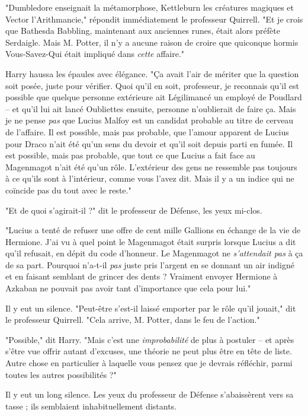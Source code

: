 "Dumbledore enseignait la métamorphose, Kettleburn les créatures magiques et Vector l'Arithmancie," répondit immédiatement le professeur Quirrell. "Et je crois que Bathesda Babbling, maintenant aux anciennes runes, était alors préfète Serdaigle. Mais M. Potter, il n'y a aucune raison de croire que quiconque hormis Vous-Savez-Qui était impliqué dans \emph{cette}  affaire."

Harry haussa les épaules avec élégance. "Ça avait l'air de mériter que la question soit posée, juste pour vérifier. Quoi qu'il en soit, professeur, je reconnais qu'il est possible que quelque personne extérieure ait Légilimancé un employé de Poudlard – et qu'il lui ait lancé Oubliettes ensuite, personne n'oublierait de faire ça. Mais je ne pense \emph{pas}  que Lucius Malfoy est un candidat probable au titre de cerveau de l'affaire. Il est possible, mais pas probable, que l'amour apparent de Lucius pour Draco n'ait été qu'un sens du devoir et qu'il soit depuis parti en fumée. Il est possible, mais pas probable, que tout ce que Lucius a fait face au Magenmagot n'ait été qu'un rôle. L'extérieur des gens ne ressemble pas toujours à ce qu'ils sont à l'intérieur, comme vous l'avez dit. Mais il y a un indice qui ne coïncide pas du tout avec le reste."

"Et de quoi s'agirait-il ?" dit le professeur de Défense, les yeux mi-clos.

"Lucius a tenté de refuser une offre de cent mille Gallions en échange de la vie de Hermione. J'ai vu à quel point le Magenmagot était surpris lorsque Lucius a dit qu'il refusait, en dépit du code d'honneur. Le Magenmagot ne \emph{s'attendait pas}  à ça de sa part. Pourquoi n'a-t-il \emph{pas}  juste pris l'argent en se donnant un air indigné et en faisant semblant de grincer des dents ? Vraiment envoyer Hermione à Azkaban ne pouvait pas avoir tant d'importance que cela pour lui."

Il y eut un silence. "Peut-être s'est-il laissé emporter par le rôle qu'il jouait," dit le professeur Quirrell. "Cela arrive, M. Potter, dans le feu de l'action."

"Possible," dit Harry. "Mais c'est une \emph{improbabilité}  de plus à postuler – et après s'être vue offrir autant d'excuses, une théorie ne peut plus être en tête de liste. Autre chose en particulier à laquelle vous pensez que je devrais réfléchir, parmi toutes les autres possibilités ?"

Il y eut un long silence. Les yeux du professeur de Défense s'abaissèrent vers sa tasse ; ils semblaient inhabituellement distants.

